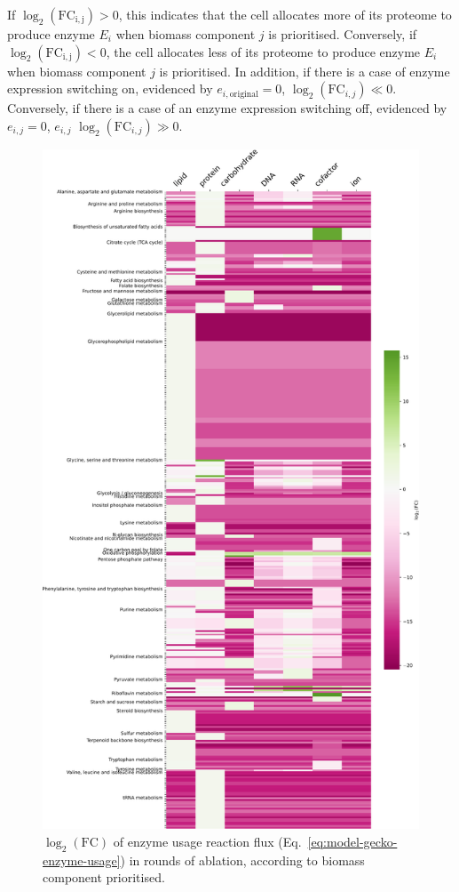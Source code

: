 If $\log_{2}(\mathrm{FC_{i,j}}) > 0$, this indicates that the cell allocates more of its proteome to produce enzyme $E_{i}$ when biomass component $j$ is prioritised.
Conversely, if $\log_{2}(\mathrm{FC_{i,j}}) < 0$, the cell allocates less of its proteome to produce enzyme $E_{i}$ when biomass component $j$ is prioritised.
In addition, if there is a case of enzyme expression switching on, evidenced by $e_{i, \mathrm{original}} = 0$, $\log_{2}(\mathrm{FC}_{i,j}) \ll 0$.
Conversely, if there is a case of an enzyme expression switching off, evidenced by $e_{i, j} = 0$, $e_{i,j}$ $\log_{2}(\mathrm{FC}_{i,j}) \gg 0$.

\begin{figure}
  \centering
  \includegraphics[width=.8\linewidth]{allocation_fc}
  \caption{
    $\log_{2}(\mathrm{FC})$ of enzyme usage reaction flux (Eq.\ \ref{eq:model-gecko-enzyme-usage}) in rounds of ablation, according to biomass component prioritised.
}
\end{figure}
